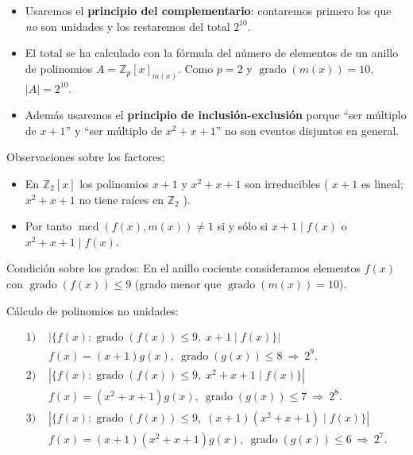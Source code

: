 \documentclass[a4paper,12pt]{article}
\begin{document}
\begin{ejercicio}[title=Ejercicio 10]
\begin{itemize}
\item Usaremos el \textbf{principio del complementario}: contaremos primero los que \emph{no} son unidades y los restaremos del total \(2^{10}\).
\item El total se ha calculado con la fórmula del número de elementos de un anillo de polinomios $A = \mathbb{Z}_p[x]_{m(x)}$. Como $p = 2$ y $\operatorname{grado}(m(x)) = 10$, $|A| = 2^{10}$.
\item Además usaremos el \textbf{principio de inclusión-exclusión} porque “ser múltiplo de \(x+1\)” y “ser múltiplo de \(x^2+x+1\)” no son eventos disjuntos en general.
\end{itemize}

Observaciones sobre los factores:
\begin{itemize}
\item En \(\mathbb{Z}_2[x]\) los polinomios \(x+1\) y \(x^2+x+1\) son irreducibles ( \(x+1\) es lineal; \(x^2+x+1\) no tiene raíces en \(\mathbb{Z}_2\) ).
\item Por tanto \(\operatorname{mcd}(f(x),m(x))\neq 1\) si y sólo si $x+1 \mid f(x)$ o $x^2+x+1 \mid f(x)$.
\end{itemize}

Condición sobre los grados:
En el anillo cociente consideramos elementos \(f(x)\) con \(\operatorname{grado}(f(x))\le 9\) (grado menor que \(\operatorname{grado}(m(x))=10\)).

\vspace{0.5em}

Cálculo de polinomios no unidades:

\[
\begin{aligned}
\text{1) } &|\{f(x): \operatorname{grado}(f(x))\le9,\; x+1\mid f(x)\}|
    \\[6pt]
    &f(x)=(x+1)g(x),\ \operatorname{grado}(g(x))\le 8
    \ \Rightarrow\ 2^{9}.\\[6pt]
\text{2) } &|\{f(x): \operatorname{grado}(f(x))\le9,\; x^2+x+1\mid f(x)\}|
    \\[6pt]
    & f(x)=(x^2+x+1)g(x),\ \operatorname{grado}(g(x))\le 7
    \ \Rightarrow\ 2^{8}.\\[6pt]
\text{3) } &|\{f(x): \operatorname{grado}(f(x))\le9,\; (x+1)(x^2+x+1)\mid f(x)\}|
    \\[6pt]
    & f(x)=(x+1)(x^2+x+1)g(x),\ \operatorname{grado}(g(x))\le 6
    \ \Rightarrow\ 2^{7}.
\end{aligned}
\]


\end{ejercicio}
\end{document}
